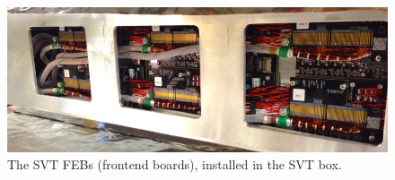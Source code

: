 \begin{figure}[ht]
    \includegraphics[width=\textwidth]{detector/figs/svt_febs}
    \caption{The SVT FEBs (frontend boards), installed in the SVT box.}
    \label{figure:svt_layout}
\end{figure}

\begin{figure}[ht]

\end{figure}
